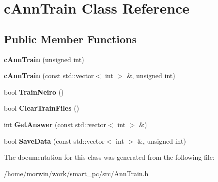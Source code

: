 \hypertarget{classcAnnTrain}{
\section{cAnnTrain Class Reference}
\label{classcAnnTrain}
}
\subsection*{Public Member Functions}
\begin{DoxyCompactItemize}
\item 
\hypertarget{classcAnnTrain_afc76d6bda29aada6396f6427fb9b5842}{
{\bfseries cAnnTrain} (unsigned int)}
\label{classcAnnTrain_afc76d6bda29aada6396f6427fb9b5842}

\item 
\hypertarget{classcAnnTrain_ad9040e366b1927db664ba132e08a5930}{
{\bfseries cAnnTrain} (const std::vector$<$ int $>$ \&, unsigned int)}
\label{classcAnnTrain_ad9040e366b1927db664ba132e08a5930}

\item 
\hypertarget{classcAnnTrain_a71367bc818ee45d7ae218de3e8abef35}{
bool {\bfseries TrainNeiro} ()}
\label{classcAnnTrain_a71367bc818ee45d7ae218de3e8abef35}

\item 
\hypertarget{classcAnnTrain_a28449a2968ab05652d221f8ac6a0a5ec}{
bool {\bfseries ClearTrainFiles} ()}
\label{classcAnnTrain_a28449a2968ab05652d221f8ac6a0a5ec}

\item 
\hypertarget{classcAnnTrain_abbb234cd2db365c051c67606b981afaa}{
int {\bfseries GetAnswer} (const std::vector$<$ int $>$ \&)}
\label{classcAnnTrain_abbb234cd2db365c051c67606b981afaa}

\item 
\hypertarget{classcAnnTrain_ac425fc0efe9cb1f098d5bfad81b0b796}{
bool {\bfseries SaveData} (const std::vector$<$ int $>$ \&, unsigned int)}
\label{classcAnnTrain_ac425fc0efe9cb1f098d5bfad81b0b796}

\end{DoxyCompactItemize}


The documentation for this class was generated from the following file:\begin{DoxyCompactItemize}
\item 
/home/morwin/work/smart\_\-pc/src/AnnTrain.h\end{DoxyCompactItemize}
